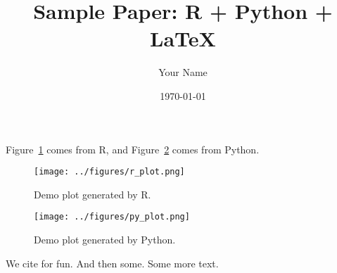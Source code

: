 \documentclass[11pt,a4paper]{article}
\title{Sample Paper: R + Python + \LaTeX{}}
\author{Your Name}
\date{\today}
\begin{document}
\maketitle

Figure~\ref{fig:rplot} comes from R, and Figure~\ref{fig:pyplot} comes from Python.

\begin{figure}[h!]
  \centering
  \texttt{[image: ../figures/r\_plot.png]}
  \caption{Demo plot generated by R.}
  \label{fig:rplot}
\end{figure}

\begin{figure}[h!]
 \centering
 \texttt{[image: ../figures/py\_plot.png]}
 \caption{Demo plot generated by Python.}
 \label{fig:pyplot}
\end{figure}

We cite \textcite{varian2014intermediate} for fun. And then some. Some more text.

\printbibliography
\end{document}

